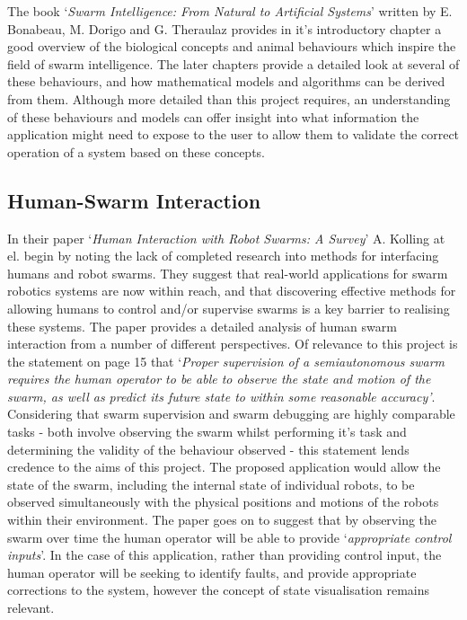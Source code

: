 \documentclass[titlepage,hidelinks,10pt]{article}
\begin{document}
\begin{multicols*}{2}
The book `\textit{Swarm Intelligence: From Natural to Artificial Systems}\cite{FromNaturaltoArtificial}' written by E. Bonabeau, M. Dorigo and G. Theraulaz provides in it's introductory chapter a good overview of the biological concepts and animal behaviours which inspire the field of swarm intelligence. The later chapters provide a detailed look at several of these behaviours, and how mathematical models and algorithms can be derived from them. Although more detailed than this project requires, an understanding of these behaviours and models can offer insight into what information the application might need to expose to the user to allow them to validate the correct operation of a system based on these concepts.

\subsection{Human-Swarm Interaction} \label{HumanSwarmInteraction}
In their paper `\textit{Human Interaction with Robot Swarms: A Survey}\cite{HumanSwarmInteractionSurvey}' A. Kolling at el. begin by noting the lack of completed research into methods for interfacing humans and robot swarms. They suggest that real-world applications for swarm robotics systems are now within reach, and that discovering effective methods for allowing humans to control and/or supervise swarms is a key barrier to realising these systems. The paper provides a detailed analysis of human swarm interaction from a number of different perspectives. Of relevance to this project is the statement on page 15 that `\textit{Proper supervision of a semiautonomous swarm requires the human operator to be able to observe the state and motion of the swarm, as well as predict its future state to within some reasonable accuracy'}. Considering that swarm supervision and swarm debugging are highly comparable tasks - both involve observing the swarm whilst performing it's task and determining the validity of the behaviour observed  - this statement lends credence to the aims of this project. The proposed application would allow the state of the swarm, including the internal state of individual robots, to be observed simultaneously with the physical positions and motions of the robots within their environment. The paper goes on to suggest that by observing the swarm over time the human operator will be able to provide `\textit{appropriate control inputs}'. In the case of this application, rather than providing control input, the human operator will be seeking to identify faults, and provide appropriate corrections to the system, however the concept of state visualisation remains relevant.


\end{multicols*}
\end{document}
